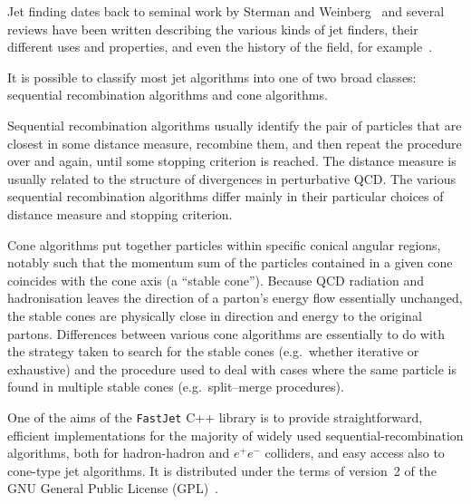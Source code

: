 \documentclass[12pt,a4]{article}
\newcommand{\fastjet}{\texttt{FastJet}\xspace}
\begin{document}
Jet finding dates back to seminal work by Sterman and
Weinberg~\cite{StermanWeinberg} and several reviews have been written
describing the various kinds of jet finders, their different uses and
properties, and even the history of the
field, for example~\cite{Moretti:1998qx,RunII-jet-physics,Ellis:2007ib,Salam:2009jx,Ali:2010tw}.

It is possible to classify most jet algorithms into one of two broad
classes: sequential recombination algorithms and cone algorithms.

Sequential recombination algorithms usually identify the pair of
particles that are closest in some distance measure, recombine them,
and then repeat the procedure over and again, until some stopping
criterion is reached. 
%
The distance measure is usually related to the structure of
divergences in perturbative QCD.
%
The various sequential recombination algorithms differ mainly in their
particular choices of distance measure and stopping criterion.

Cone algorithms put together particles within specific conical angular
regions, notably such that the momentum sum of the particles contained
in a given cone coincides with the cone axis (a ``stable cone'').
%
Because QCD radiation and hadronisation leaves the direction of a
parton's energy flow essentially unchanged, the stable cones are
physically close in direction and energy to the original partons.
%
Differences between various cone algorithms are essentially to do with
the strategy taken to search for the stable cones (e.g.\ whether
iterative or exhaustive) and the procedure used to deal with cases
where the same particle is found in multiple stable cones (e.g.\
split--merge procedures).

One of the aims of the \fastjet C++ library is to provide
straightforward, efficient implementations for the majority of widely
used sequential-recombination algorithms, both for hadron-hadron and
$e^+e^-$ colliders, and easy access also to cone-type jet algorithms.
%
It is distributed under the terms of version~2 of the GNU General Public License
(GPL)~\cite{GPLv2}.
\end{document}
